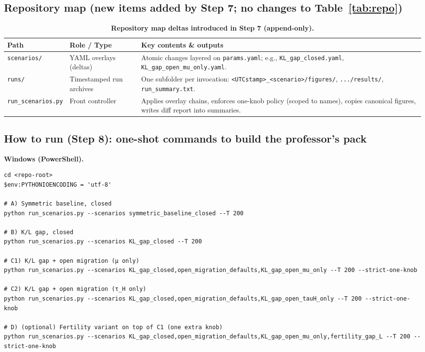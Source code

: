 \documentclass[12pt,a4paper]{article}
\begin{document}
\subsection*{Repository map (new items added by Step 7; no changes to Table~\ref{tab:repo})}
\begin{small}
\begin{table}[H]
\centering
\begin{tabularx}{\textwidth}{@{} l l Y @{}}
\toprule
\textbf{Path} & \textbf{Role / Type} & \textbf{Key contents \& outputs} \\
\midrule
\nolinkurl{scenarios/} &
YAML overlays (deltas) &
Atomic changes layered on \nolinkurl{params.yaml}; e.g., \nolinkurl{KL_gap_closed.yaml}, \nolinkurl{KL_gap_open_mu_only.yaml}. \\[3pt]

\nolinkurl{runs/} &
Timestamped run archives &
One subfolder per invocation: \nolinkurl{<UTCstamp>_<scenario>/figures/}, \nolinkurl{.../results/}, \nolinkurl{run_summary.txt}. \\[3pt]

\nolinkurl{run_scenarios.py} &
Front controller &
Applies overlay chains, enforces one-knob policy (scoped to names), copies canonical figures, writes diff report into summaries. \\
\bottomrule
\end{tabularx}
\caption{\textbf{Repository map deltas introduced in Step 7 (append-only).}}
\end{table}
\end{small}


\subsection*{How to run (Step 8): one-shot commands to build the professor's pack}

\begin{mdframed}[backgroundcolor=gray!06,linewidth=0.5pt]
\textbf{Windows (PowerShell).}
\begin{Verbatim}[fontsize=\small]
cd <repo-root>
$env:PYTHONIOENCODING = 'utf-8'

# A) Symmetric baseline, closed
python run_scenarios.py --scenarios symmetric_baseline_closed --T 200

# B) K/L gap, closed
python run_scenarios.py --scenarios KL_gap_closed --T 200

# C1) K/L gap + open migration (μ only)
python run_scenarios.py --scenarios KL_gap_closed,open_migration_defaults,KL_gap_open_mu_only --T 200 --strict-one-knob

# C2) K/L gap + open migration (τ_H only)
python run_scenarios.py --scenarios KL_gap_closed,open_migration_defaults,KL_gap_open_tauH_only --T 200 --strict-one-knob

# D) (optional) Fertility variant on top of C1 (one extra knob)
python run_scenarios.py --scenarios KL_gap_closed,open_migration_defaults,KL_gap_open_mu_only,fertility_gap_L --T 200 --strict-one-knob
\end{Verbatim}
\end{mdframed}
\end{document}
